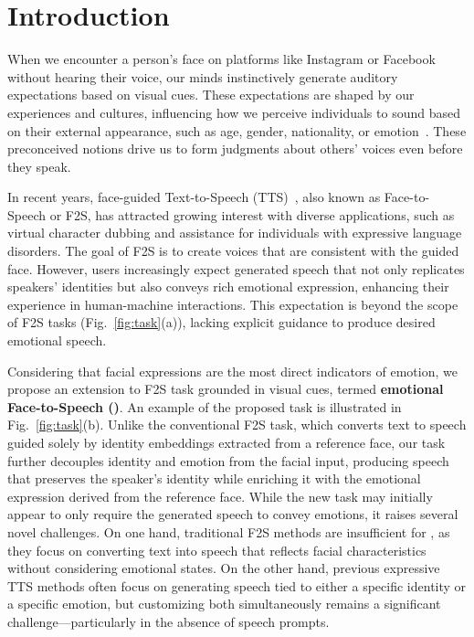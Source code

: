 \section{Introduction}
\label{sec:intro}

When we encounter a person's face on platforms like Instagram or Facebook without hearing their voice, our minds instinctively generate auditory expectations based on visual cues. 
These expectations are shaped by our experiences and cultures, influencing how we perceive individuals to sound based on their external appearance, such as age, gender, nationality, or emotion~\cite{paris2017visual,taitelbaum2016}. These preconceived notions drive us to form judgments about others’ voices even before they speak. 

In recent years, face-guided Text-to-Speech (TTS)~\cite{Face2Speech:conf/interspeech/GotoOSTM20,facestylespeech:journals/corr/abs-2311-05844,facespeak:conf/cvpr/JangKAKYJKKC24}, also known as Face-to-Speech or F2S, has attracted growing interest with diverse applications, such as virtual character dubbing and assistance for individuals with expressive language disorders. The goal of F2S is to create voices that are consistent with the guided face. 
However, users increasingly expect generated speech that not only replicates speakers' identities but also conveys rich emotional expression, enhancing their experience in human-machine interactions. This expectation is beyond the scope of F2S tasks (Fig.~\ref{fig:task}(a)), lacking explicit guidance to produce desired emotional speech. 

Considering that facial expressions are the most direct indicators of emotion, we propose an extension to F2S task grounded in visual cues, termed \textbf{emotional Face-to-Speech (\taskname)}. An example of the proposed \taskname task is illustrated in Fig.~\ref{fig:task}(b). 
Unlike the conventional F2S task, which converts text to speech guided solely by identity embeddings extracted from a reference face, our \taskname task further decouples identity and emotion from the facial input, producing speech that preserves the speaker's identity while enriching it with the emotional expression derived from the reference face. 
While the new \taskname task may initially appear to only require the generated speech to convey emotions, it raises several novel challenges.
On one hand, traditional F2S methods are insufficient for \taskname, as they focus on converting text into speech that reflects facial characteristics without considering emotional states. 
On the other hand, previous expressive TTS methods often focus on generating speech tied to either a specific identity or a specific emotion, but customizing both simultaneously remains a significant challenge---particularly in the absence of speech prompts.

